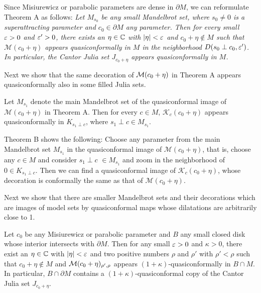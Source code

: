 Since Misiurewicz or parabolic parameters are dense in $\partial M$, 
we can reformulate Theorem A as follows: 
{\it 
Let $M_{s_0}$ be any small Mandelbrot set, where $s_0 \ne 0$ is a
superattracting parameter and $c_0 \in \partial M$ 
any parameter. Then
for every small $\varepsilon > 0$ and $\varepsilon' > 0$, there exists an $\eta \in \mathbb C$
with $|\eta| < \varepsilon$ and $c_0+\eta \notin  M$ such that
${\mathcal M}(c_0+\eta)$ appears quasiconformally in $M$ in the 
neighborhood $D(s_0 \perp c_0, \varepsilon')$. In particular, the Cantor
Julia set $J_{c_0+\eta}$ appears quasiconformally in $M$. 
}


Next we show that the same decoration of ${\mathcal{M}}(c_0+\eta)$ in Theorem A
appears quasiconformally also in some filled Julia sets.



\begin{thmB*}
Let $M_{s_1}$ denote the main Mandelbrot set of the quasiconformal image of
${\mathcal M}(c_0+\eta)$ in Theorem A. Then for every 
$c \in M$, ${\mathcal K}_{c}(c_0+\eta)$ appears 
quasiconformally in $K_{s_1 \perp c}$, where $s_1 \perp c \in M_{s_1}$.
\end{thmB*} 




\noin
Theorem B shows the following: Choose any parameter from the main Mandelbrot
set $M_{s_1}$ in the quasiconformal image of ${\mathcal M}(c_0+\eta)$,
that is, choose any $c \in M$ and consider $s_1 \perp c$ $\in M_{s_1}$
and zoom in the neighborhood of $0 \in K_{s_1 \perp c}$. Then we can find
a quasiconformal image of ${\mathcal K}_{c}(c_0+\eta)$, whose decoration is
conformally the same as that of ${\mathcal M}(c_0+\eta)$.





Next we show that there are smaller Mandelbrot sets and their 
decorations which are images of model sets by quasiconformal maps
whose dilatations are arbitrarily close to 1.




\begin{thmC*}
Let $c_0$ be any Misiurewicz or parabolic parameter
and $B$ any small closed disk whose interior intersects with $\partial M$.
Then for any small $\varepsilon > 0$ and $\kappa>0$,
there exist an $\eta \in \mathbb C$ with $|\eta| < \varepsilon$ and two positive numbers
$\rho$ and $\rho'$ with $\rho' < \rho$ 
such that $c_0 +\eta \notin M$ and ${\mathcal{M}}(c_0+\eta)_{\rho', \rho}$ 
appears $(1+\kappa)$-quasiconformally 
in $B \cap M$.
In particular, $B \cap \partial M$ contains a $(1+\kappa)$-quasiconformal
copy of the Cantor Julia set $J_{c_0+\eta}$.
\end{thmC*}





